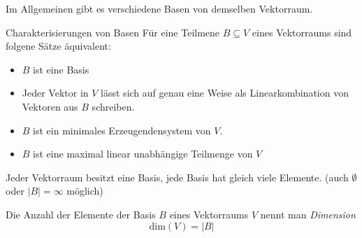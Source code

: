 Im Allgemeinen gibt es verschiedene Basen von demselben Vektorraum.

\begin{satz}{Charakterisierungen von Basen}
  Für eine Teilmene $B\subseteq V$ eines Vektorraums sind folgene Sätze äquivalent:
  \begin{itemize}
    \item $B$ ist eine Basis
    \item Jeder Vektor in $V$ lässt sich auf genau eine Weise als Linearkombination von Vektoren aus $B$ schreiben.
    \item $B$ ist ein minimales Erzeugendensystem von $V$.
    \item $B$ ist eine maximal linear unabhängige Teilmenge von $V$
  \end{itemize}
\end{satz}

\bemerkung
Jeder Vektorraum besitzt eine Basis, jede Basis hat gleich viele Elemente. (auch $\emptyset$ oder $|B|=\infty$ möglich)

Die Anzahl der Elemente der Basis $B$ eines Vektorraums $V$ nennt man \emph{Dimension}
\begin{equation*}
  \mathrm{dim}(V)=|B|
\end{equation*}
